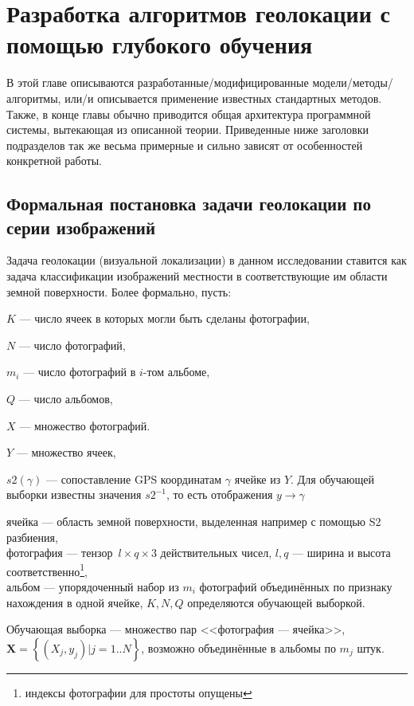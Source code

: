  \chapter{Разработка алгоритмов геолокации с помощью глубокого обучения}

В этой главе описываются разработанные/модифицированные модели/методы/
алгоритмы, или/и описывается применение известных стандартных методов. Также, 
в конце главы обычно приводится общая архитектура программной системы, 
вытекающая из описанной теории. Приведенные ниже заголовки подразделов так же 
весьма примерные и сильно зависят от особенностей конкретной работы.
\section{Формальная постановка задачи геолокации по серии изображений}

Задача геолокации (визуальной локализации) в данном исследовании ставится как задача классификации изображений местности в соответствующие им области земной поверхности. Более формально, пусть:

\begin{compactitem}
	\item $K$ --- число ячеек в которых могли быть сделаны фотографии,
	\item $N$ --- число фотографий,
	\item $m_i$ --- число фотографий в $i$-том альбоме,
	\item $ Q $ --- число альбомов,
	\item $X$ --- множество фотографий. 
	\item $ Y $ --- множество ячеек, 
	\item $ s2(\gamma) $ --- сопоставление GPS координатам $ \gamma $ ячейке из $ Y $. Для обучающей выборки известны значения $ s2^{-1} $, то есть отображения $ y \to \gamma $
\end{compactitem}
ячейка --- область земной поверхности, выделенная например с помощью S2 разбиения,\\
фотография --- тензор\, $ l \times q \times 3$  действительных чисел, $ l, q $ --- ширина 
и высота соответственно\footnote{индексы фотографии для простоты опущены},\\
альбом --- упорядоченный набор из $ m_i $ фотографий объединённых по признаку нахождения в одной ячейке, 
$ K, N, Q $ определяются обучающей выборкой.

Обучающая выборка --- множество пар <<фотография --- ячейка>>, $\mathbf{X} = \left\{(X_j, y_j)|j = 1 .. N \right\} $, возможно объединённые в альбомы по $ m_j $ штук.

